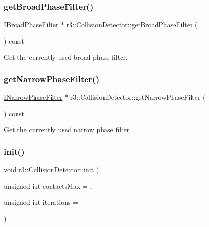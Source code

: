 \subsubsection{\texorpdfstring{get\+Broad\+Phase\+Filter()}{getBroadPhaseFilter()}}
{\footnotesize\ttfamily \mbox{\hyperlink{classr3_1_1_i_broad_phase_filter}{I\+Broad\+Phase\+Filter}} $\ast$ r3\+::\+Collision\+Detector\+::get\+Broad\+Phase\+Filter (\begin{DoxyParamCaption}{ }\end{DoxyParamCaption}) const}

Get the currently used broad phase filter. \mbox{\label{classr3_1_1_collision_detector_aa43b5d1332028d15a3c9af1ec4cd4312}} 
\subsubsection{\texorpdfstring{get\+Narrow\+Phase\+Filter()}{getNarrowPhaseFilter()}}
{\footnotesize\ttfamily \mbox{\hyperlink{classr3_1_1_i_narrow_phase_filter}{I\+Narrow\+Phase\+Filter}} $\ast$ r3\+::\+Collision\+Detector\+::get\+Narrow\+Phase\+Filter (\begin{DoxyParamCaption}{ }\end{DoxyParamCaption}) const}

Get the currently used narrow phase filter \mbox{\label{classr3_1_1_collision_detector_acaa771728b3edcf398724f0295151eb4}} 
\subsubsection{\texorpdfstring{init()}{init()}}
{\footnotesize\ttfamily void r3\+::\+Collision\+Detector\+::init (\begin{DoxyParamCaption}\item[{unsigned int}]{contacts\+Max = {},  }\item[{unsigned int}]{iterations = {} }\end{DoxyParamCaption})}

